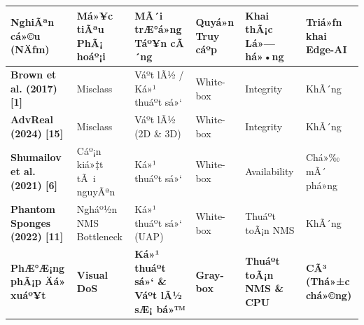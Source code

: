 \documentclass[]{article}
\newcounter{none} %
\begin{document}
{\def\LTcaptype{none} %
\begin{longtable}[]{@{}
  >{\centering\arraybackslash}p{}
  >{\centering\arraybackslash}p{}
  >{\centering\arraybackslash}p{}
  >{\centering\arraybackslash}p{}
  >{\centering\arraybackslash}p{}
  >{\centering\arraybackslash}p{}@{}}
\toprule\noalign{}
\begin{minipage}[b]{\linewidth}\centering
\textbf{NghiÃªn cá»©u (NÄƒm)}
\end{minipage} & \begin{minipage}[b]{\linewidth}\centering
\textbf{Má»¥c tiÃªu PhÃ¡ hoáº¡i}
\end{minipage} & \begin{minipage}[b]{\linewidth}\centering
\textbf{MÃ´i trÆ°á»ng Táº¥n cÃ´ng}
\end{minipage} & \begin{minipage}[b]{\linewidth}\centering
\textbf{Quyá»n Truy cáº­p}
\end{minipage} & \begin{minipage}[b]{\linewidth}\centering
\textbf{Khai thÃ¡c Lá»— há»•ng}
\end{minipage} & \begin{minipage}[b]{\linewidth}\centering
\textbf{Triá»ƒn khai Edge-AI}
\end{minipage} \\
\midrule\noalign{}
\endhead
\bottomrule\noalign{}
\endlastfoot
\textbf{Brown et al. (2017) {[}1{]}} & Misclass & Váº­t lÃ½ / Ká»¹
thuáº­t sá»‘ & White-box & Integrity & KhÃ´ng \\
\textbf{AdvReal (2024) {[}15{]}} & Misclass & Váº­t lÃ½ (2D \&
3D) & White-box & Integrity & KhÃ´ng \\
\textbf{Shumailov et al. (2021) {[}6{]}} & Cáº¡n kiá»‡t tÃ i nguyÃªn & Ká»¹
thuáº­t sá»‘ & White-box & Availability & Chá»‰ mÃ´ phá»ng \\
\textbf{Phantom Sponges (2022) {[}11{]}} & Ngháº½n NMS Bottleneck & Ká»¹
thuáº­t sá»‘ (UAP) & White-box & Thuáº­t toÃ¡n NMS & KhÃ´ng \\
\textbf{PhÆ°Æ¡ng phÃ¡p Äá» xuáº¥t} & \textbf{Visual DoS} &
\textbf{Ká»¹ thuáº­t sá»‘ \& Váº­t lÃ½ sÆ¡ bá»™} & \textbf{Gray-box} &
\textbf{Thuáº­t toÃ¡n NMS \& CPU} & \textbf{CÃ³ (Thá»±c chá»©ng)} \\
\end{longtable}
}
\end{document}
